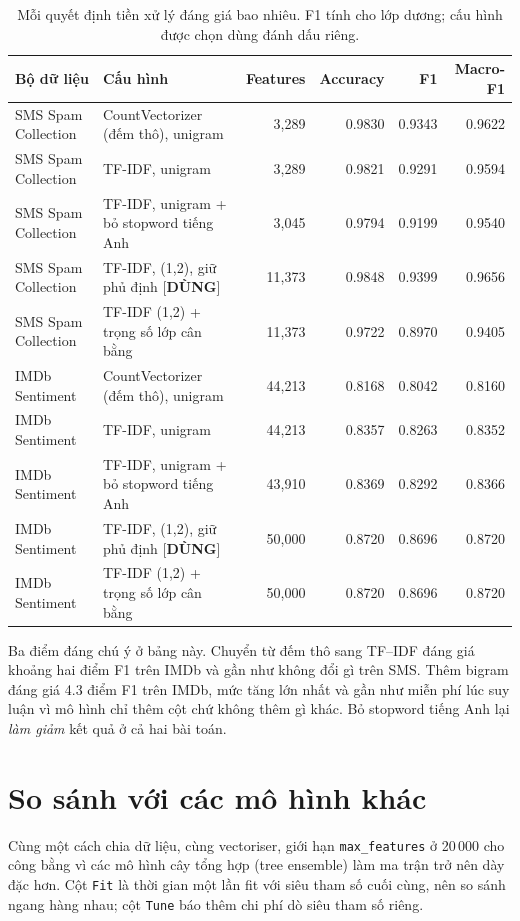 \documentclass[11pt,a4paper]{article}
\newcommand{\code}[1]{\texttt{#1}}
\begin{document}
\begin{table}[H]
\centering
\caption{Mỗi quyết định tiền xử lý đáng giá bao nhiêu. F1 tính cho lớp dương; cấu hình được chọn dùng đánh dấu riêng.}
\label{tab:ablation}
\footnotesize
\begin{tabular}{@{}llrrrr@{}}
\toprule
\textbf{Bộ dữ liệu} & \textbf{Cấu hình} & \textbf{Features} & \textbf{Accuracy} & \textbf{F1} & \textbf{Macro-F1} \\
\midrule
SMS Spam Collection & CountVectorizer (đếm thô), unigram & 3,289 & 0.9830 & 0.9343 & 0.9622 \\
SMS Spam Collection & TF-IDF, unigram & 3,289 & 0.9821 & 0.9291 & 0.9594 \\
SMS Spam Collection & TF-IDF, unigram + bỏ stopword tiếng Anh & 3,045 & 0.9794 & 0.9199 & 0.9540 \\
SMS Spam Collection & TF-IDF, (1,2), giữ phủ định  [\textbf{DÙNG}] & 11,373 & 0.9848 & 0.9399 & 0.9656 \\
SMS Spam Collection & TF-IDF (1,2) + trọng số lớp cân bằng & 11,373 & 0.9722 & 0.8970 & 0.9405 \\
\midrule
IMDb Sentiment & CountVectorizer (đếm thô), unigram & 44,213 & 0.8168 & 0.8042 & 0.8160 \\
IMDb Sentiment & TF-IDF, unigram & 44,213 & 0.8357 & 0.8263 & 0.8352 \\
IMDb Sentiment & TF-IDF, unigram + bỏ stopword tiếng Anh & 43,910 & 0.8369 & 0.8292 & 0.8366 \\
IMDb Sentiment & TF-IDF, (1,2), giữ phủ định  [\textbf{DÙNG}] & 50,000 & 0.8720 & 0.8696 & 0.8720 \\
IMDb Sentiment & TF-IDF (1,2) + trọng số lớp cân bằng & 50,000 & 0.8720 & 0.8696 & 0.8720 \\
\bottomrule
\end{tabular}
\end{table}

Ba điểm đáng chú ý ở bảng này. Chuyển từ đếm thô sang TF--IDF đáng giá khoảng hai điểm F1 trên IMDb và gần như không đổi gì trên SMS. Thêm bigram đáng giá 4.3 điểm F1 trên IMDb, mức tăng lớn nhất và gần như miễn phí lúc suy luận vì mô hình chỉ thêm cột chứ không thêm gì khác. Bỏ stopword tiếng Anh lại \emph{làm giảm} kết quả ở cả hai bài toán.

\section{So sánh với các mô hình khác}

Cùng một cách chia dữ liệu, cùng vectoriser, giới hạn \code{max\_features} ở 20\,000 cho công bằng vì các mô hình cây tổng hợp (tree ensemble) làm ma trận trở nên dày đặc hơn. Cột \code{Fit} là thời gian một lần fit với siêu tham số cuối cùng, nên so sánh ngang hàng nhau; cột \code{Tune} báo thêm chi phí dò siêu tham số riêng.
\end{document}
